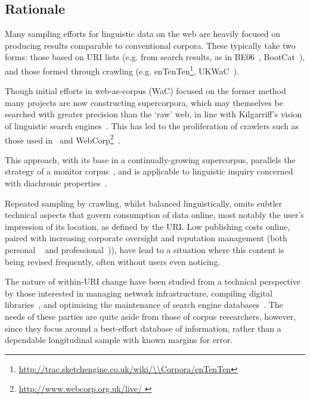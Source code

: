 

\subsection{Rationale}

Many sampling efforts for linguistic data on the web are heavily focused on producing results comparable to conventional corpora.  These typically take two forms: those based on URI lists (e.g. from search results, as in %
BE06~\cite{baker2009be06}, BootCat~\cite{baroni2004bootcat}), and those formed through crawling (e.g. enTenTen\footnote{\url{http://trac.sketchengine.co.uk/wiki/\\Corpora/enTenTen}}, %
UKWaC~\cite{ferraresi2008introducing}).

Though initial efforts in web-as-corpus (WaC) focused on the former method %
many projects are now constructing supercorpora, which may themselves be searched with greater precision than the `raw' web, in line with Kilgarriff's vision of linguistic search engines~\cite{kilgarriff2003linguistic}.  This has led to the proliferation of crawlers such as those used in~\cite{schafer8building} and WebCorp\footnote{\url{http://www.webcorp.org.uk/live/
}}~\cite{renouf2003webcorp}.


This approach, with its base in a continually-growing supercorpus, parallels the strategy of a monitor corpus~\cite{sinclair1982monitor}, and is applicable to linguistic inquiry concerned with diachronic properties~\cite{kehoe2006diachronic}.


Repeated sampling by crawling, whilst balanced linguistically, omits subtler technical aspects that govern consumption of data online, most notably the user's impression of its location, as defined by the URI.  Low publishing costs online, paired with increasing corporate oversight and reputation management (both personal ~\cite{ICT4DBibliography1650} 
and professional~\cite{Malaga2000repman})), have lead to a situation where this content is being revised frequently, often without users even noticing.

The nature of within-URI change have been studied from a technical perspective by those interested in managing network infrastructure, compiling digital libraries~\cite{tyler2003librarians}, and optimising the maintenance of search engine databases~\cite{koehler2004longitudinal}.  The needs of these parties are quite aside from those of corpus researchers, however, since they focus around a best-effort database of information, rather than a dependable longitudinal sample with known margins for error.

